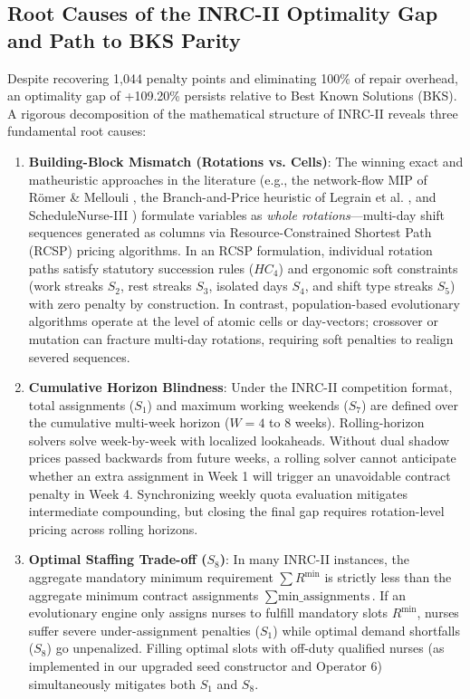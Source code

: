 \documentclass[10pt,journal,compsoc]{IEEEtran}
\begin{document}
\subsection{Root Causes of the INRC-II Optimality Gap and Path to BKS Parity}
Despite recovering 1,044 penalty points and eliminating 100\% of repair overhead, an optimality gap of +109.20\% persists relative to Best Known Solutions (BKS). A rigorous decomposition of the mathematical structure of INRC-II reveals three fundamental root causes:
\begin{enumerate}
    \item \textbf{Building-Block Mismatch (Rotations vs. Cells)}: The winning exact and matheuristic approaches in the literature (e.g., the network-flow MIP of R{\"o}mer \& Mellouli \cite{romer2016flow}, the Branch-and-Price heuristic of Legrain et al. \cite{legrain2020branch}, and ScheduleNurse-III \cite{smet2014nurse}) formulate variables as \textit{whole rotations}---multi-day shift sequences generated as columns via Resource-Constrained Shortest Path (RCSP) pricing algorithms. In an RCSP formulation, individual rotation paths satisfy statutory succession rules ($HC_4$) and ergonomic soft constraints (work streaks $S_2$, rest streaks $S_3$, isolated days $S_4$, and shift type streaks $S_5$) with zero penalty by construction. In contrast, population-based evolutionary algorithms operate at the level of atomic cells or day-vectors; crossover or mutation can fracture multi-day rotations, requiring soft penalties to realign severed sequences.
    \item \textbf{Cumulative Horizon Blindness}: Under the INRC-II competition format, total assignments ($S_1$) and maximum working weekends ($S_7$) are defined over the cumulative multi-week horizon ($W = 4$ to $8$ weeks). Rolling-horizon solvers solve week-by-week with localized lookaheads. Without dual shadow prices passed backwards from future weeks, a rolling solver cannot anticipate whether an extra assignment in Week 1 will trigger an unavoidable contract penalty in Week 4. Synchronizing weekly quota evaluation mitigates intermediate compounding, but closing the final gap requires rotation-level pricing across rolling horizons.
    \item \textbf{Optimal Staffing Trade-off ($S_8$)}: In many INRC-II instances, the aggregate mandatory minimum requirement $\sum R^{\min}$ is strictly less than the aggregate minimum contract assignments $\sum \text{min\_assignments}$. If an evolutionary engine only assigns nurses to fulfill mandatory slots $R^{\min}$, nurses suffer severe under-assignment penalties ($S_1$) while optimal demand shortfalls ($S_8$) go unpenalized. Filling optimal slots with off-duty qualified nurses (as implemented in our upgraded seed constructor and Operator 6) simultaneously mitigates both $S_1$ and $S_8$.
\end{enumerate}
\end{document}
